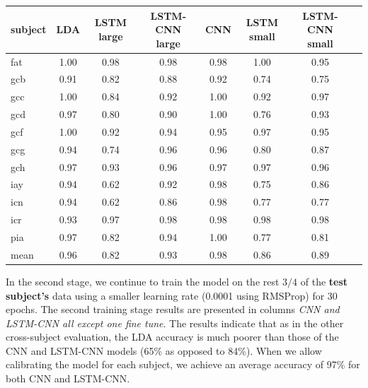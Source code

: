 \documentclass[
12pt, %
english, %
doublespacing, %
headsepline, %
]{MastersDoctoralThesis} %
\begin{document}
\begin{table}
	\centering
	\label{table:AccuracyPerSubject}	
	\begin{tabular}{l|ccccccc}
		\toprule
		{subject} &   LDA &   LSTM large &  LSTM-CNN large &   CNN &  LSTM small& LSTM-CNN small \\
		\midrule
		fat     &  1.00 &  0.98 &      0.98 &  0.98 &        1.00 &            0.95 \\
		gcb     &  0.91 &  0.82 &      0.88 &  0.92 &        0.74 &            0.75 \\
		gcc     &  1.00 &  0.84 &      0.92 &  1.00 &        0.92 &            0.97 \\
		gcd     &  0.97 &  0.80 &      0.90 &  1.00 &        0.76 &            0.93 \\
		gcf     &  1.00 &  0.92 &      0.94 &  0.95 &        0.97 &            0.95 \\
		gcg     &  0.94 &  0.74 &      0.96 &  0.96 &        0.80 &            0.87 \\
		gch     &  0.97 &  0.93 &      0.96 &  0.97 &        0.97 &            0.96 \\
		iay     &  0.94 &  0.62 &      0.92 &  0.98 &        0.75 &            0.86 \\
		icn     &  0.94 &  0.62 &      0.86 &  0.98 &        0.77 &            0.77 \\
		icr     &  0.93 &  0.97 &      0.98 &  0.98 &        0.98 &            0.98 \\
		pia     &  0.97 &  0.82 &      0.94 &  1.00 &        0.77 &            0.81 \\
		mean    &  0.96 &  0.82 &      0.93 &  0.98 &        0.86 &            0.89 \\
		\bottomrule
	\end{tabular}
	
\end{table}

In the second stage, we continue to train the model on the rest $3/4$ of the \textbf{test subject's} data using a smaller learning rate (0.0001 using RMSProp) for 30 epochs. The second training stage results are presented in columns \textit{CNN and LSTM-CNN all except one fine tune}. The results indicate that as in the other cross-subject evaluation, the LDA accuracy is much poorer than those of the CNN and LSTM-CNN models (65\% as opposed to 84\%). When we allow calibrating the model for each subject, we achieve an average accuracy of 97\% for both CNN and LSTM-CNN.
\end{document}

